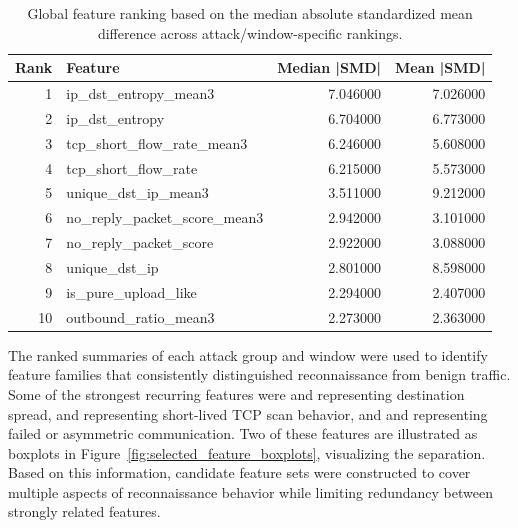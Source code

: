 \begin{table}
\caption{Global feature ranking based on the median absolute standardized mean difference across attack/window-specific rankings.}
\label{tab:global_feature_ranking}
\begin{tabular}{r l r r}
\toprule
Rank & Feature & Median |SMD| & Mean |SMD| \\
\midrule
1 & ip\_dst\_entropy\_mean3 & 7.046000 & 7.026000 \\
2 & ip\_dst\_entropy & 6.704000 & 6.773000 \\
3 & tcp\_short\_flow\_rate\_mean3 & 6.246000 & 5.608000 \\
4 & tcp\_short\_flow\_rate & 6.215000 & 5.573000 \\
5 & unique\_dst\_ip\_mean3 & 3.511000 & 9.212000 \\
6 & no\_reply\_packet\_score\_mean3 & 2.942000 & 3.101000 \\
7 & no\_reply\_packet\_score & 2.922000 & 3.088000 \\
8 & unique\_dst\_ip & 2.801000 & 8.598000 \\
9 & is\_pure\_upload\_like & 2.294000 & 2.407000 \\
10 & outbound\_ratio\_mean3 & 2.273000 & 2.363000 \\
\bottomrule
\end{tabular}
\end{table}





The ranked summaries of each attack group and window were used to identify feature families that consistently distinguished reconnaissance from benign traffic. Some of the strongest recurring features were  and  representing destination spread,  and  representing short-lived TCP scan behavior, and  and  representing failed or asymmetric communication. Two of these features are illustrated as boxplots in Figure~\ref{fig:selected_feature_boxplots}, visualizing the separation. Based on this information, candidate feature sets were constructed to cover multiple aspects of reconnaissance behavior while limiting redundancy between strongly related features.

